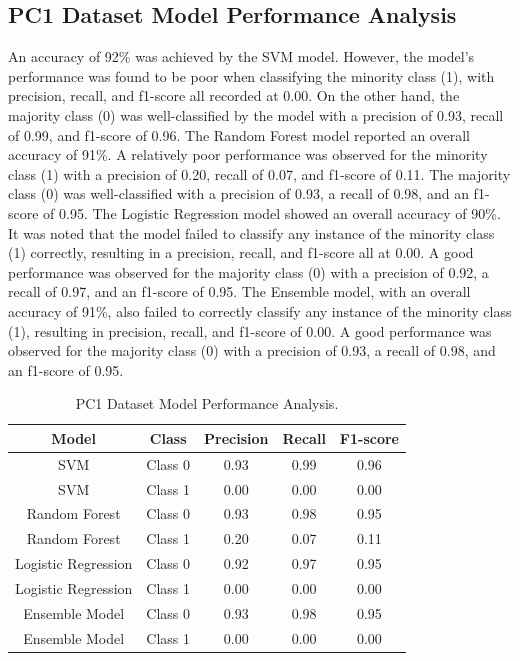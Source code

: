 \documentclass[12pt]{report}
\begin{document}
\subsection*{PC1 Dataset Model Performance Analysis}
An accuracy of 92\% was achieved by the SVM model. However, the model's
performance was found to be poor when classifying the minority class (1), with
precision, recall, and f1-score all recorded at 0.00. On the other hand, the
majority class (0) was well-classified by the model with a precision of 0.93,
recall of 0.99, and f1-score of 0.96. The Random Forest model reported an
overall accuracy of 91\%. A relatively poor performance was observed for the
minority class (1) with a precision of 0.20, recall of 0.07, and f1-score of
0.11. The majority class (0) was well-classified with a precision of 0.93, a
recall of 0.98, and an f1-score of 0.95. The Logistic Regression model showed
an overall accuracy of 90\%. It was noted that the model failed to classify any
instance of the minority class (1) correctly, resulting in a precision, recall,
and f1-score all at 0.00. A good performance was observed for the majority
class (0) with a precision of 0.92, a recall of 0.97, and an f1-score of 0.95.
The Ensemble model, with an overall accuracy of 91\%, also failed to correctly
classify any instance of the minority class (1), resulting in precision,
recall, and f1-score of 0.00. A good performance was observed for the majority
class (0) with a precision of 0.93, a recall of 0.98, and an f1-score of
0.95.\\

\begin{table}[ht]
    \centering
    \begin{tabular}{|c|c|c|c|c|}
        \hline
        Model               & Class   & Precision & Recall & F1-score \\
        \hline
        SVM                 & Class 0 & 0.93      & 0.99   & 0.96     \\
        SVM                 & Class 1 & 0.00      & 0.00   & 0.00     \\
        \hline
        Random Forest       & Class 0 & 0.93      & 0.98   & 0.95     \\
        Random Forest       & Class 1 & 0.20      & 0.07   & 0.11     \\
        \hline
        Logistic Regression & Class 0 & 0.92      & 0.97   & 0.95     \\
        Logistic Regression & Class 1 & 0.00      & 0.00   & 0.00     \\
        \hline
        Ensemble Model      & Class 0 & 0.93      & 0.98   & 0.95     \\
        Ensemble Model      & Class 1 & 0.00      & 0.00   & 0.00     \\
        \hline
    \end{tabular}
    \caption{PC1 Dataset Model Performance Analysis.}
    \label{tab:PC1 Performance Analysis}
\end{table}
\end{document}
